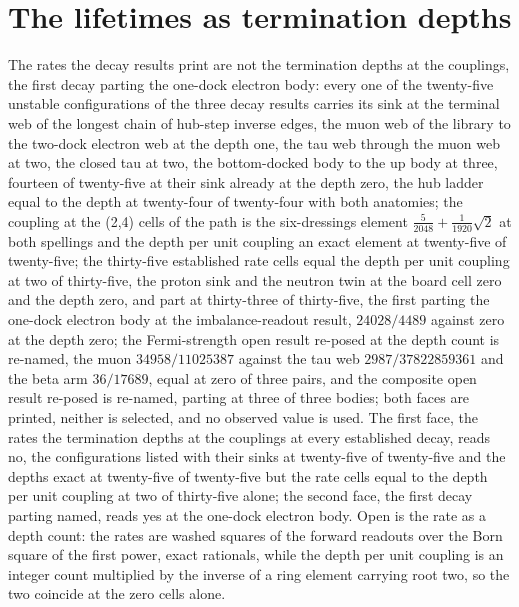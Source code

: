 \section{The lifetimes as termination depths}\label{mod:IX-4-D543346-w-lftd}
\begin{chwall}\label{box:IX-4-D543346-w-lftd:1}
The rates the decay results print are not the termination depths at the couplings, the first decay parting the one-dock electron body: every one of the twenty-five unstable configurations of the three decay results carries its sink at the terminal web of the longest chain of hub-step inverse edges, the muon web of the library to the two-dock electron web at the depth one, the tau web through the muon web at two, the closed tau at two, the bottom-docked body to the up body at three, fourteen of twenty-five at their sink already at the depth zero, the hub ladder equal to the depth at twenty-four of twenty-four with both anatomies; the coupling at the (2,4) cells of the path is the six-dressings element $\tfrac{5}{2048} + \tfrac{1}{1920}\sqrt{2}$ at both spellings and the depth per unit coupling an exact element at twenty-five of twenty-five; the thirty-five established rate cells equal the depth per unit coupling at two of thirty-five, the proton sink and the neutron twin at the board cell zero and the depth zero, and part at thirty-three of thirty-five, the first parting the one-dock electron body at the imbalance-readout result, $24028/4489$ against zero at the depth zero; the Fermi-strength open result re-posed at the depth count is re-named, the muon $34958/11025387$ against the tau web $2987/37822859361$ and the beta arm $36/17689$, equal at zero of three pairs, and the composite open result re-posed is re-named, parting at three of three bodies; both faces are printed, neither is selected, and no observed value is used.
The first face, the rates the termination depths at the couplings at every established decay, reads no, the configurations listed with their sinks at twenty-five of twenty-five and the depths exact at twenty-five of twenty-five but the rate cells equal to the depth per unit coupling at two of thirty-five alone; the second face, the first decay parting named, reads yes at the one-dock electron body. Open is the rate as a depth count: the rates are washed squares of the forward readouts over the Born square of the first power, exact rationals, while the depth per unit coupling is an integer count multiplied by the inverse of a ring element carrying root two, so the two coincide at the zero cells alone.
\end{chwall}
